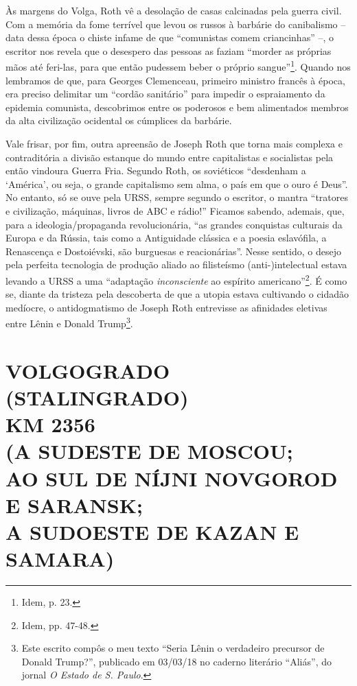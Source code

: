 Às margens do Volga, Roth vê a desolação de casas calcinadas pela guerra
civil. Com a memória da fome terrível que levou os russos à barbárie do
canibalismo -- data dessa época o chiste infame de que ``comunistas
comem criancinhas'' --, o escritor nos revela que o desespero das
pessoas as faziam ``morder as próprias mãos até feri-las, para que então
pudessem beber o próprio sangue''\footnote{Idem, p. 23.}. Quando nos
lembramos de que, para Georges Clemenceau, primeiro ministro francês à
época, era preciso delimitar um ``cordão sanitário'' para impedir o
espraiamento da epidemia comunista, descobrimos entre os poderosos e bem
alimentados membros da alta civilização ocidental os cúmplices da
barbárie.

Vale frisar, por fim, outra apreensão de Joseph Roth que torna mais
complexa e contraditória a divisão estanque do mundo entre capitalistas
e socialistas pela então vindoura Guerra Fria. Segundo Roth, os
soviéticos ``desdenham a `América', ou seja, o grande capitalismo sem
alma, o país em que o ouro é Deus''. No entanto, só se ouve pela URSS,
sempre segundo o escritor, o mantra ``tratores e civilização, máquinas,
livros de ABC e rádio!'' Ficamos sabendo, ademais, que, para a
ideologia/propaganda revolucionária, ``as grandes conquistas culturais
da Europa e da Rússia, tais como a Antiguidade clássica e a poesia
eslavófila, a Renascença e Dostoiévski, são burguesas e reacionárias''.
Nesse sentido, o desejo pela perfeita tecnologia de produção aliado ao
filisteísmo (anti-)intelectual estava levando a URSS a uma ``adaptação
\emph{inconsciente} ao espírito americano''\footnote{Idem, pp. 47-48.}.
É como se, diante da tristeza pela descoberta de que a utopia estava
cultivando o cidadão medíocre, o antidogmatismo de Joseph Roth
entrevisse as afinidades eletivas entre Lênin e Donald Trump\footnote{Este
  escrito compôs o meu texto ``Seria Lênin o verdadeiro precursor de
  Donald Trump?'', publicado em 03/03/18 no caderno literário ``Aliás'',
  do jornal \emph{O Estado de S. Paulo}.}.

\newpage
{}
\part*{VOLGOGRADO (STALINGRADO)\\KM 2356\\(A SUDESTE DE MOSCOU;\\AO SUL DE NÍJNI NOVGOROD E SARANSK;\\A SUDOESTE DE KAZAN E SAMARA)}

